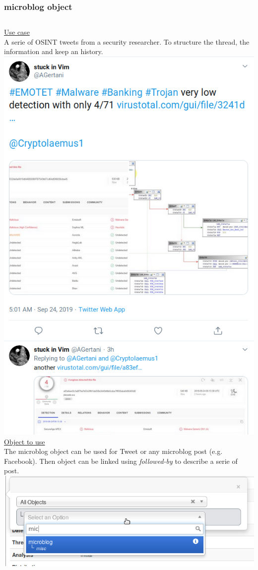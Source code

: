 \begin{frame}
\frametitle{microblog object}
\begin{columns}[totalwidth=\textwidth]
        \underline{Use case}\\
A serie of OSINT tweets from a security researcher.
To structure the thread, the information
and keep an history.\\
        \includegraphics[scale=0.15]{emotet.png}
        \underline{Object to use}\\
        The microblog object can be used for Tweet or any microblog post (e.g. Facebook). Then object can be linked using {\it followed-by} to describe a serie of post.\\
        \includegraphics[scale=0.15]{microblog.png}
\end{columns}
\end{frame}


